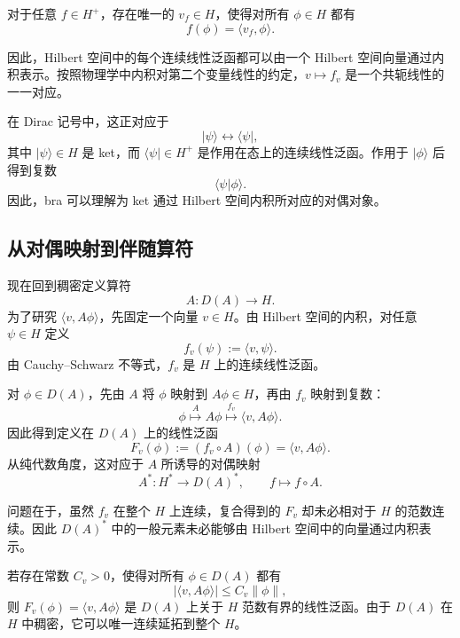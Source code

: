\documentclass[UTF8,a4paper,11pt,openany]{ctexbook}
\begin{document}
\begin{proposition}
对于任意 $f\in H^+$，存在唯一的 $v_f\in H$，使得对所有 $\phi\in H$ 都有
\begin{equation}
    f(\phi)
    =
    \langle v_f,\phi\rangle.
\end{equation}
\end{proposition}

因此，Hilbert 空间中的每个连续线性泛函都可以由一个 Hilbert 空间向量通过内积表示。按照物理学中内积对第二个变量线性的约定，$v\mapsto f_v$ 是一个共轭线性的一一对应。

在 Dirac 记号中，这正对应于
\[
|\psi\rangle
\longleftrightarrow
\langle\psi|,
\]
其中 $|\psi\rangle\in H$ 是 ket，而 $\langle\psi|\in H^+$ 是作用在态上的连续线性泛函。作用于 $|\phi\rangle$ 后得到复数
\[
\langle\psi|\phi\rangle.
\]
因此，bra 可以理解为 ket 通过 Hilbert 空间内积所对应的对偶对象。

\subsection{从对偶映射到伴随算符}

现在回到稠密定义算符
\[
A:D(A)\to H.
\]
为了研究 $\langle v,A\phi\rangle$，先固定一个向量 $v\in H$。由 Hilbert 空间的内积，对任意 $\psi\in H$ 定义
\[
f_v(\psi):=\langle v,\psi\rangle.
\]
由 Cauchy--Schwarz 不等式，$f_v$ 是 $H$ 上的连续线性泛函。

对 $\phi\in D(A)$，先由 $A$ 将 $\phi$ 映射到 $A\phi\in H$，再由 $f_v$ 映射到复数：
\[
\phi
\overset{A}{\longmapsto}
A\phi
\overset{f_v}{\longmapsto}
\langle v,A\phi\rangle.
\]
因此得到定义在 $D(A)$ 上的线性泛函
\begin{equation}
    F_v(\phi)
    :=
    (f_v\circ A)(\phi)
    =
    \langle v,A\phi\rangle.
\end{equation}
从纯代数角度，这对应于 $A$ 所诱导的对偶映射
\begin{equation}
    A^*:H^*\to D(A)^*,
    \qquad
    f\mapsto f\circ A.
\end{equation}

问题在于，虽然 $f_v$ 在整个 $H$ 上连续，复合得到的 $F_v$ 却未必相对于 $H$ 的范数连续。因此 $D(A)^*$ 中的一般元素未必能够由 Hilbert 空间中的向量通过内积表示。

若存在常数 $C_v>0$，使得对所有 $\phi\in D(A)$ 都有
\begin{equation}
    |\langle v,A\phi\rangle|
    \leq
    C_v\|\phi\|,
\end{equation}
则 $F_v(\phi)=\langle v,A\phi\rangle$ 是 $D(A)$ 上关于 $H$ 范数有界的线性泛函。由于 $D(A)$ 在 $H$ 中稠密，它可以唯一连续延拓到整个 $H$。
\end{document}
